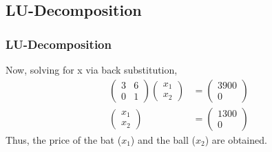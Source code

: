 \documentclass{beamer}
\theoremstyle{remark}
\newcommand{\myvec}[1]{\ensuremath{\begin{pmatrix}#1\end{pmatrix}}}
\numberwithin{equation}{section}
\begin{document}
\subsection{LU-Decomposition}
\begin{frame}
	\frametitle{LU-Decomposition}
	Now, solving for x via back substitution, 
	\begin{align}
		\myvec{3&6\\0&1}\myvec{x_1 \\ x_2} &= \myvec{3900 \\ 0} \\
		\myvec{x_1 \\ x_2} &= \myvec{1300 \\ 0} 
	\end{align}
	Thus, the price of the bat ($x_1$) and the ball ($x_2$) are obtained.\\
\end{frame}
\end{document}
